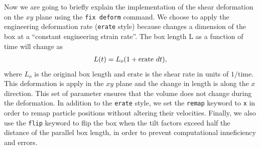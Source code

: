Now we are going to briefly explain the implementation of the shear deformation on the $xy$ plane using the \verb|fix deform| command.
We choose to apply the engineering deformation rate (\verb|erate| style) because changes a dimension of the box at a “constant engineering strain rate”.
The box length L as a function of time will change as
\begin{gather}
    L(t) = L_o\qty(1 + \mathrm{erate}~dt),
\end{gather}
where $L_o$ is the original box length and $\mathrm{erate}$ is the shear rate in units of $1/\mathrm{time}$\citep{LAMMPS}.
This deformation is apply in the $xy$ plane and the change in length is along the $x$ direction.
This set of parameter ensures that the volume does not change during the deformation\citep{LAMMPS}.
In addition to the \verb|erate| style, we set the \verb|remap| keyword to \verb|x| in order to remap particle positions without altering their velocities\citep{LAMMPS}.
Finally, we also use the \verb|flip| keyword to flip the box when the tilt factors exceed half the distance of the parallel box length, in order to prevent computational inneficiency and errors\citep{LAMMPS}.

